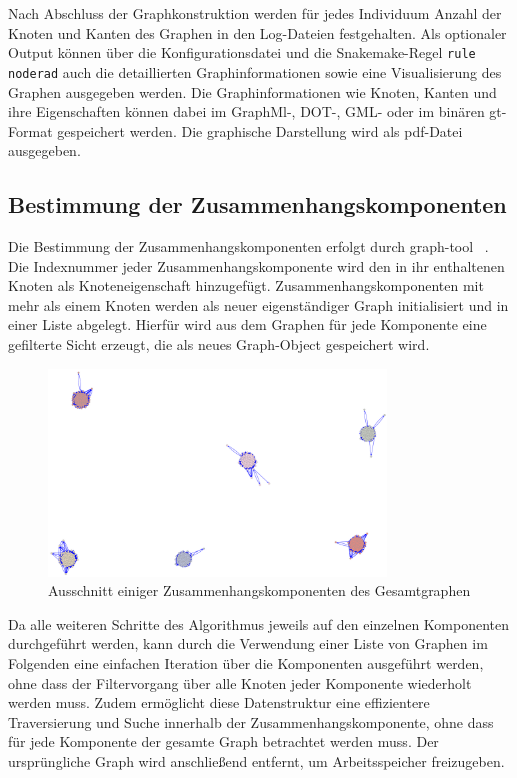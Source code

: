 Nach Abschluss der Graphkonstruktion werden für jedes Individuum Anzahl der Knoten und Kanten des Graphen in den Log-Dateien festgehalten. Als optionaler Output können über die Konfigurationsdatei und die Snakemake-Regel \lstinline|rule noderad| auch die detaillierten Graphinformationen sowie eine Visualisierung des Graphen ausgegeben werden. Die Graphinformationen wie Knoten, Kanten und ihre Eigenschaften können dabei im GraphMl-, DOT-, GML- oder im binären gt-Format gespeichert werden. Die graphische Darstellung wird als pdf-Datei ausgegeben. \\

\subsection{Bestimmung der Zusammenhangskomponenten} \label{subsec:comp}

Die Bestimmung der Zusammenhangskomponenten erfolgt durch graph-tool ~\cite{docs_graph_tool}. Die Indexnummer jeder Zusammenhangskomponente wird den in ihr enthaltenen Knoten als Knoteneigenschaft hinzugefügt. Zusammenhangskomponenten mit mehr als einem Knoten  werden als neuer eigenständiger Graph initialisiert und in einer Liste abgelegt. Hierfür wird aus dem Graphen für jede Komponente eine gefilterte Sicht erzeugt, die als neues Graph-Object gespeichert wird. \\

\begin{figure}[H]
	\begin{center}
		\includegraphics[width=0.8\textwidth]{bilder/components_all_5.png}
		\caption{Ausschnitt einiger Zusammenhangskomponenten des Gesamtgraphen }
		\label{fig:all_comp} 
	\end{center}
\end{figure}

Da alle weiteren Schritte des Algorithmus jeweils auf den einzelnen Komponenten durchgeführt werden, kann durch die Verwendung einer Liste von Graphen im Folgenden eine einfachen Iteration über die Komponenten ausgeführt werden, ohne dass der Filtervorgang über alle Knoten jeder Komponente wiederholt werden muss. Zudem ermöglicht diese Datenstruktur eine effizientere Traversierung und Suche innerhalb der Zusammenhangskomponente, ohne dass für jede Komponente der gesamte Graph betrachtet werden muss. Der ursprüngliche Graph wird anschließend entfernt, um Arbeitsspeicher freizugeben. \\

